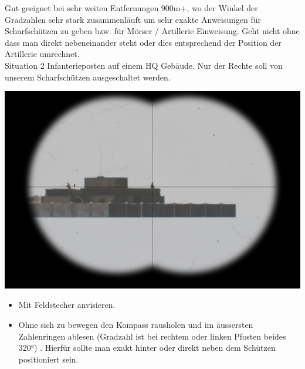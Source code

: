 	Gut geeignet bei sehr weiten Entfernungen 900m+, wo der Winkel der Gradzahlen sehr stark zusammenläuft um sehr exakte Anweisungen für Scharfschützen zu geben bzw. für Mörser / Artillerie Einweisung. Geht nicht ohne dass man direkt nebeneinander steht oder dies entsprechend der Position der Artillerie umrechnet.  \\

 

	Situation 2 Infanterieposten auf einem HQ Gebäude. Nur der Rechte soll von unserem Scharfschützen ausgeschaltet werden.  \\
\begin{minipage}[t]{1\textwidth}
	\includegraphics[width=\textwidth]{./img/fortgeschrittenes/karteUndMarkierungen/Kompass5.jpg}
\end{minipage}

		\begin{itemize}
 			\item Mit Feldstecher anvisieren.
			\item Ohne sich zu bewegen den Kompass rausholen und im äussersten Zahlenringen ablesen (Gradzahl ist bei rechtem oder linken Pfosten beides 320°) . Hierfür sollte man exakt hinter oder direkt neben dem Schützen positioniert sein.
		\end{itemize}

